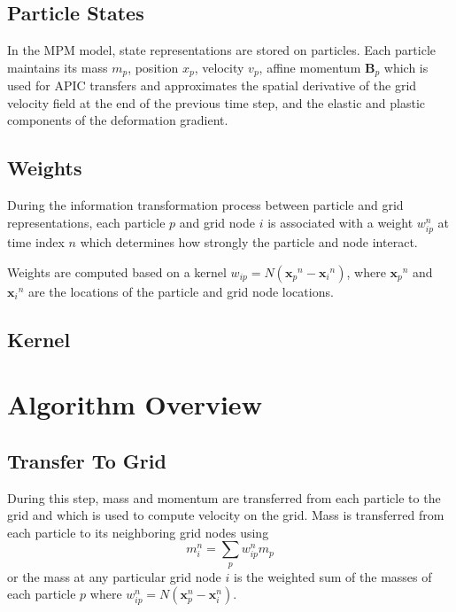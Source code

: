\documentclass{scrartcl}
\theoremstyle{definition}
\begin{document}
\subsection{Particle States}
In the MPM model, state representations are stored on particles. Each particle maintains  its mass $m_p$, position $x_p$, velocity $v_p$, affine momentum $\textbf{B}_p$ which is used for APIC transfers and approximates the spatial derivative of the grid velocity field at the end of the previous time step, and the elastic and plastic components of the deformation gradient.

\subsection{Weights}
During the information transformation process between particle and grid representations, each particle $p$ and grid node $i$ is associated with a weight $w_{ip}^n$ at time index $n$ which determines how strongly the particle and node interact.

Weights are computed based on a kernel $w_{ip} = N({\textbf{x}_p}^n - {\textbf{x}_i}^n)$, where ${\textbf{x}_p}^n$ and ${\textbf{x}_i}^n$ are the locations of the particle and grid node locations.

\subsection{Kernel}

\section{Algorithm Overview}

\subsection{Transfer To Grid}
During this step, mass and momentum are transferred from each particle to the grid and which is used to compute velocity on the grid. Mass is transferred from each particle to its neighboring grid nodes using
\begin{equation*}
m_i^n = \sum_p{w_{ip}^n m_p}
\end{equation*}
or the mass at any particular grid node $i$ is the weighted sum of the masses of each particle $p$ where $w_{ip}^n = N(\textbf{x}_p^n-\textbf{x}_i^n)$.
\end{document}
